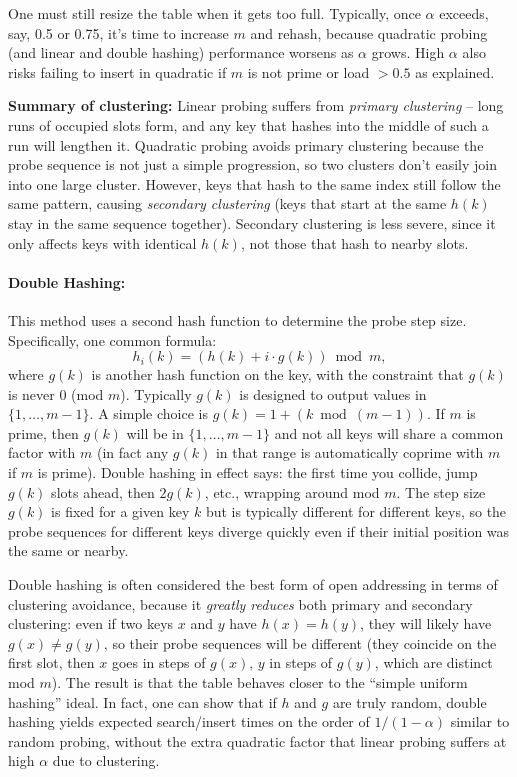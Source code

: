 \documentclass[11pt]{article}
\begin{document}
One must still resize the table when it gets too full. Typically, once $\alpha$ exceeds, say, 0.5 or 0.75, it’s time to increase $m$ and rehash, because quadratic probing (and linear and double hashing) performance worsens as $\alpha$ grows. High $\alpha$ also risks failing to insert in quadratic if $m$ is not prime or load $> 0.5$ as explained.

\textbf{Summary of clustering:} Linear probing suffers from \emph{primary clustering} – long runs of occupied slots form, and any key that hashes into the middle of such a run will lengthen it. Quadratic probing avoids primary clustering because the probe sequence is not just a simple progression, so two clusters don’t easily join into one large cluster. However, keys that hash to the same index still follow the same pattern, causing \emph{secondary clustering} (keys that start at the same $h(k)$ stay in the same sequence together). Secondary clustering is less severe, since it only affects keys with identical $h(k)$, not those that hash to nearby slots. 

\paragraph{Double Hashing:} This method uses a second hash function to determine the probe step size. Specifically, one common formula:
\[ h_i(k) = (h(k) + i \cdot g(k)) \bmod m, \]
where $g(k)$ is another hash function on the key, with the constraint that $g(k)$ is never 0 (mod $m$). Typically $g(k)$ is designed to output values in $\{1,\ldots,m-1\}$. A simple choice is $g(k) = 1 + (k \bmod (m-1))$. If $m$ is prime, then $g(k)$ will be in $\{1,\ldots,m-1\}$ and not all keys will share a common factor with $m$ (in fact any $g(k)$ in that range is automatically coprime with $m$ if $m$ is prime). Double hashing in effect says: the first time you collide, jump $g(k)$ slots ahead, then $2g(k)$, etc., wrapping around mod $m$. The step size $g(k)$ is fixed for a given key $k$ but is typically different for different keys, so the probe sequences for different keys diverge quickly even if their initial position was the same or nearby.

Double hashing is often considered the best form of open addressing in terms of clustering avoidance, because it \emph{greatly reduces} both primary and secondary clustering: even if two keys $x$ and $y$ have $h(x) = h(y)$, they will likely have $g(x) \neq g(y)$, so their probe sequences will be different (they coincide on the first slot, then $x$ goes in steps of $g(x)$, $y$ in steps of $g(y)$, which are distinct mod $m$). The result is that the table behaves closer to the “simple uniform hashing” ideal. In fact, one can show that if $h$ and $g$ are truly random, double hashing yields expected search/insert times on the order of $1/(1-\alpha)$ similar to random probing, without the extra quadratic factor that linear probing suffers at high $\alpha$ due to clustering.
\end{document}
